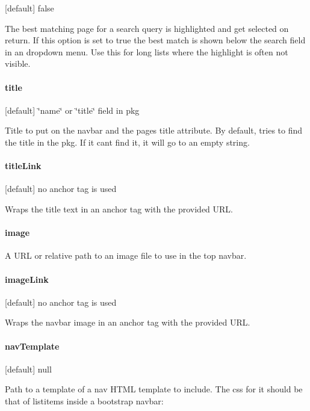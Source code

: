 \mbox{[}default\mbox{]} false

The best matching page for a search query is highlighted and get selected on return. If this option is set to true the best match is shown below the search field in an dropdown menu. Use this for long lists where the highlight is often not visible.

\paragraph*{title}

\mbox{[}default\mbox{]} \char`\"{}name\char`\"{} or \char`\"{}title\char`\"{} field in {\ttfamily pkg}

Title to put on the navbar and the page\textquotesingle{}s {\ttfamily title} attribute. By default, tries to find the title in the {\ttfamily pkg}. If it can\textquotesingle{}t find it, it will go to an empty string.

\paragraph*{title\+Link}

\mbox{[}default\mbox{]} no anchor tag is used

Wraps the title text in an anchor tag with the provided U\+R\+L.

\paragraph*{image}

A U\+R\+L or relative path to an image file to use in the top navbar.

\paragraph*{image\+Link}

\mbox{[}default\mbox{]} no anchor tag is used

Wraps the navbar image in an anchor tag with the provided U\+R\+L.

\paragraph*{nav\+Template}

\mbox{[}default\mbox{]} null

Path to a template of a nav H\+T\+M\+L template to include. The css for it should be that of listitems inside a bootstrap navbar\+:


